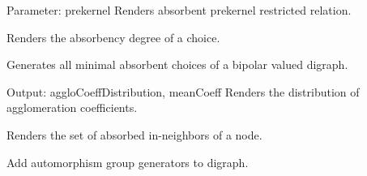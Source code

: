 \documentclass[letterpaper,10pt,english]{sphinxmanual}
\begin{document}
\begin{fulllineitems}
\begin{fulllineitems}
\label{techDoc:digraphs.Digraph.abskernelrestrict}
Parameter: prekernel
Renders absorbent prekernel restricted relation.

\end{fulllineitems}


\begin{fulllineitems}
\label{techDoc:digraphs.Digraph.absorb}
Renders the absorbency degree of a choice.

\end{fulllineitems}


\begin{fulllineitems}
\label{techDoc:digraphs.Digraph.absorbentChoices}
Generates all minimal absorbent choices of a bipolar valued digraph.

\end{fulllineitems}


\begin{fulllineitems}
\label{techDoc:digraphs.Digraph.agglomerationDistribution}
Output: aggloCoeffDistribution, meanCoeff
Renders the distribution of agglomeration coefficients.

\end{fulllineitems}


\begin{fulllineitems}
\label{techDoc:digraphs.Digraph.aneighbors}
Renders the set of absorbed in-neighbors of a node.

\end{fulllineitems}


\begin{fulllineitems}
\label{techDoc:digraphs.Digraph.automorphismGenerators}
Add automorphism group generators to digraph.


\end{fulllineitems}
\end{fulllineitems}
\end{document}
